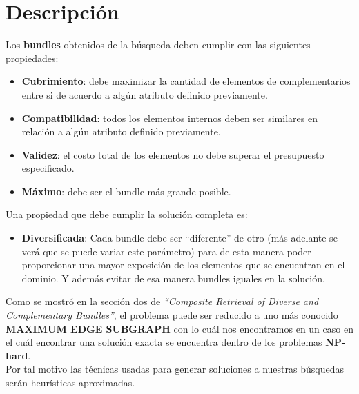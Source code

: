 \section{Descripción}
Los \textbf{bundles} obtenidos de la búsqueda deben cumplir con las siguientes propiedades:
\begin{itemize}
  \item \textbf{Cubrimiento}: debe maximizar la cantidad de elementos de complementarios entre si 
de acuerdo a algún atributo definido previamente.
  \item \textbf{Compatibilidad}: todos los elementos internos deben ser similares en relación a 
algún atributo definido previamente.
  \item \textbf{Validez}: el costo total de los elementos no debe superar el presupuesto 
especificado.
  \item \textbf{Máximo}: debe ser el bundle más grande posible.
\end{itemize}
Una propiedad que debe cumplir la solución completa es:
\begin{itemize}
  \item \textbf{Diversificada}: Cada bundle debe ser \textquotedblleft diferente\textquotedblright  
de otro (más adelante se verá que se puede variar este parámetro) para de esta manera poder 
proporcionar una mayor exposición de los elementos que se encuentran en el dominio. Y además evitar 
de esa manera bundles iguales en la solución.
\end{itemize}
Como se mostró en la sección dos de \textit{\textquotedblleft Composite Retrieval of Diverse and 
Complementary Bundles\textquotedblright}\cite{compositeRetrival}, el problema puede ser reducido a 
uno más conocido \textbf{MAXIMUM EDGE SUBGRAPH} con lo cuál nos encontramos en un caso en el cuál 
encontrar una solución exacta se encuentra dentro de los problemas \textbf{NP-hard}.\\
Por tal motivo las técnicas usadas para generar soluciones a nuestras búsquedas serán heurísticas 
aproximadas.
